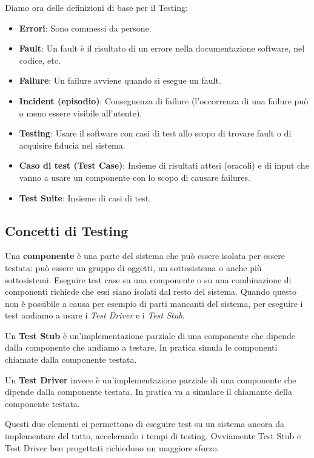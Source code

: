         Diamo ora delle definizioni di base per il Testing:
        \begin{itemize}
            \item \textbf{Errori}: Sono commessi da persone.
            \item \textbf{Fault}: Un fault è il risultato di un errore nella documentazione software, nel codice, etc.
            \item \textbf{Failure}: Un failure avviene quando si esegue un fault.
            \item \textbf{Incident (episodio)}: Conseguenza di failure (l'occorrenza di una failure può o meno essere visibile all'utente).
            \item \textbf{Testing}: Usare il software con casi di test allo scopo di trovare fault o di acquisire fiducia nel sistema.
            \item \textbf{Caso di test (Test Case)}: Insieme di risultati attesi (oracoli) e di input che vanno a usare un componente con lo scopo di causare failures.
            \item \textbf{Test Suite}: Insieme di casi di test.
        \end{itemize}
        
        \subsection{Concetti di Testing}
            Una \textbf{componente} è una parte del sistema che può essere isolata per essere testata: può essere un gruppo di oggetti, un sottosistema o anche più sottosistemi. Eseguire test case su una componente o su una combinazione di componenti richiede che essi siano isolati dal resto del sistema. Quando questo non è possibile a causa per esempio di parti mancanti del sistema, per eseguire i test andiamo a usare i \textit{Test Driver} e i \textit{Test Stub}.
        
            Un \textbf{Test Stub} è un'implementazione parziale di una componente che dipende dalla componente che andiamo a testare. In pratica simula le componenti chiamate dalla componente testata.
        
            Un \textbf{Test Driver} invece è un'implementazione parziale di una componente che dipende dalla componente testata. In pratica va a simulare il chiamante della componente testata.
        
            Questi due elementi ci permettono di eseguire test su un sistema ancora da implementare del tutto, accelerando i tempi di testing. Ovviamente Test Stub e Test Driver ben progettati richiedono un maggiore sforzo.
        
